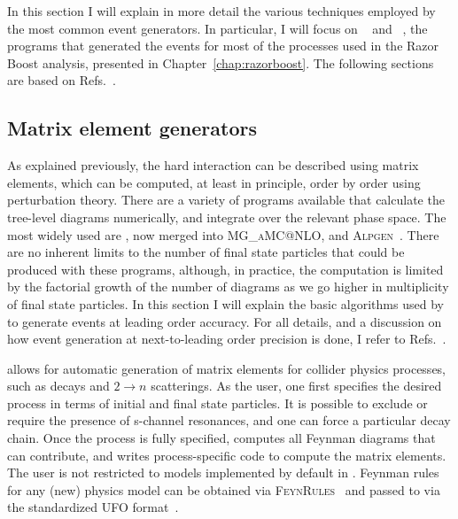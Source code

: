 

In this section I will explain in more detail the various techniques employed by the most common
event generators. In particular, I will focus on \MADGRAPH~\cite{Alwall:2011uj,Alwall:2014hca} and
\PYTHIA~\cite{Sjostrand:2006za}, the programs that generated the events for most of the processes
used in the Razor Boost analysis, presented in Chapter~\ref{chap:razorboost}. 
The following sections are based on
Refs.~\cite{Campbell:2006wx,Salam:2010zt,Skands:2011pf,Buckley:2011ms,Sjostrand:2006za,Alwall:2011uj
,Alwall:2014hca}. 

\subsection{Matrix element generators \label{sec:event_matrix_element_generators}}

As explained previously, the hard interaction can be described using matrix elements, which can be
computed, at least in principle, order by order using perturbation theory. 
There are a variety of programs available that calculate the tree-level diagrams numerically,
and integrate over the relevant phase space. The most widely used are \MADGRAPH, now merged
into \textsc{MG\_aMC@NLO}, and \textsc{Alpgen}~\cite{Mangano:2002ea}. 
There are no inherent limits to the number of final state particles that could be produced with
these programs, although, in practice, the computation is limited by the factorial growth of the
number of diagrams as we go higher in multiplicity of final state particles. 
In this section I will explain the basic algorithms used by \MADGRAPH to generate events at leading
order accuracy. For all details, and a discussion on how event generation at next-to-leading order
precision is done, I refer to Refs.~\cite{Alwall:2011uj,Alwall:2014hca}.

\MADGRAPH allows for automatic generation of matrix elements for collider physics processes, such as
decays and $2 \rightarrow n$ scatterings. 
As the user, one first specifies the desired process in terms of initial and
final state particles. It is possible to exclude or require the presence of s-channel resonances,
and one can force a particular decay chain. 
Once the process is fully specified, \MADGRAPH computes all Feynman diagrams that can contribute,
and writes process-specific code to compute the matrix elements. The user is not restricted
to models implemented by default in \MADGRAPH. Feynman rules for any (new) physics model can be
obtained via \textsc{FeynRules}~\cite{Alloul:2013bka} and passed to \MADGRAPH via the standardized
UFO format~\cite{Degrande:2011ua}. 

